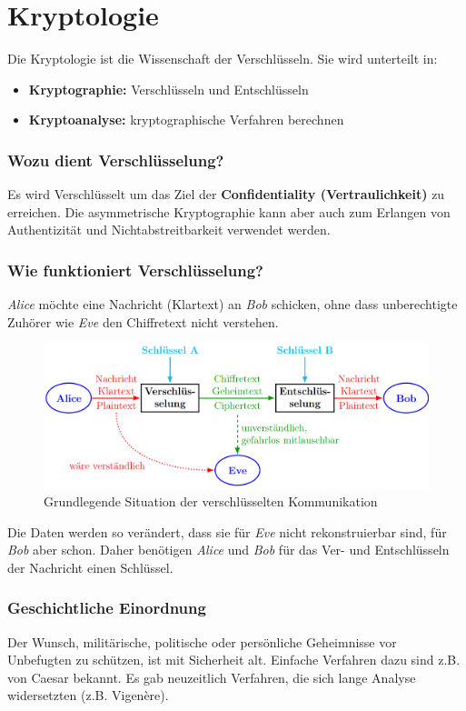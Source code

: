\chapter{Kryptologie}
Die Kryptologie ist die Wissenschaft der Verschlüsseln. Sie wird unterteilt in:
\begin{itemize}
	\item \textbf{Kryptographie:} Verschlüsseln und Entschlüsseln
	\item \textbf{Kryptoanalyse:} kryptographische Verfahren berechnen
\end{itemize}

\subsection*{Wozu dient Verschlüsselung?}
Es wird Verschlüsselt um das Ziel der \textbf{Confidentiality (Vertraulichkeit)} zu erreichen. Die asymmetrische Kryptographie kann aber auch zum Erlangen von Authentizität und Nichtabstreitbarkeit verwendet werden.

\subsection*{Wie funktioniert Verschlüsselung?}
\textit{Alice} möchte eine Nachricht (Klartext) an \textit{Bob} schicken, ohne dass unberechtigte Zuhörer wie \textit{Eve} den Chiffretext nicht verstehen. 
\begin{figure}[H]
	\centering
	\includegraphics[width=1.0\linewidth]{figures/verschallg.png}
	\caption{Grundlegende Situation der verschlüsselten Kommunikation}
\end{figure}
Die Daten werden so verändert, dass sie für \textit{Eve} nicht rekonstruierbar sind, für \textit{Bob} aber schon. Daher benötigen \textit{Alice} und \textit{Bob} für das Ver- und Entschlüsseln der Nachricht einen Schlüssel.


\subsection*{Geschichtliche Einordnung}
Der Wunsch, militärische, politische oder persönliche Geheimnisse vor Unbefugten zu schützen, ist mit Sicherheit alt. Einfache Verfahren dazu sind z.B. von Caesar bekannt. Es gab neuzeitlich Verfahren, die sich lange Analyse widersetzten (z.B. Vigenère). 

